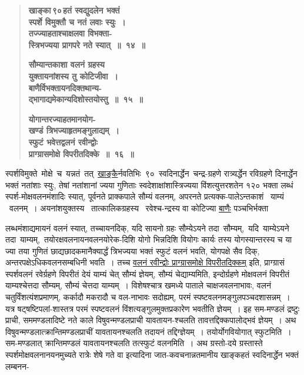 \documentclass[11pt, openany]{book}
\begin{document}
 \label{4.14}
\begin{quote}
{\large \textbf{{\color{purple}खाङ्का\textendash \,९०\textendash \,हतं स्वद्युदलेन भक्तं \\
स्पर्शे विमुक्तौ च नतं लवाः स्युः~।\\ 
तज्ज्याहताश्चाक्षलवा विभक्ता-\\
स्त्रिभज्यया प्रागपरे नते स्यात्~॥~१४~॥}}
\vspace{1mm}

 \label{4.15}
\textbf{{\color{purple}सौम्यान्तकाशा वलनं ग्रहस्य \\
युक्तायनांशस्य तु कोटिजीवा~। \\
बाणैर्विभक्तायनदिक्तथान्य-\\
द्भागाद्यमेकान्यदिशोस्तयोस्तु~॥~१५~॥}}
\vspace{1mm}

 \label{4.16}
\textbf{{\color{purple}योगान्तरज्याहतमानयोग-\\
खण्डं त्रिभज्याहृतमङ्गुलाद्यम्~। \\
स्फुटं भवेत्तद्वलनं रवीन्द्वोः \\
प्राग्ग्रासमोक्षे विपरीतदिक्के~॥~१६~॥}}}
\end{quote}

स्पर्शविमुक्ते \,मोक्षे \,च \,यन्नतं \,तत् \,\hyperref[4.14]{खाङ्कै}र्नवतिभिः \,९० \,स्वदिनार्द्धेन \,चन्द्र-ग्रहणे रात्र्यर्द्धेन रविग्रहणे दिनार्द्धेन भक्तं नतांशाः स्युः, तेषां नतांशानां ज्यया गुणिताः \;स्वदेशाक्षांशास्त्रिज्यया \;विंशत्युत्तरशतेन \;१२० \;भक्ता \;लब्धं \;स्पर्श-मोक्षवलनमंशादिः स्यात्, पूर्वनते प्राक्कपाले सौम्यं वलनम्, अपरनते प्रत्यक्क-पालेऽन्तकाशं ~याम्यं ~वलनम्~। अयनांशयुक्तस्य ~तात्कालिकग्रहस्य ~रवेश्च-न्द्रस्य वा कोटिज्या \hyperref[4.15]{बाणैः} पञ्चभिर्भक्ता

\newpage

\noindent लब्धमंशाद्यमायनं वलनं स्यात्, तच्चायनदिक्, यदि सायनो ग्रहः सौम्येऽयने तदा \,सौम्यम्, \,यदि \,याम्येऽयने \,तदा \,याम्यम्, \,तयोरक्षवलनायनवलनयोरेक-दिशि योगो भिन्नदिशि वियोगः कार्यः तस्य योगस्यान्तरस्य च या ज्या तया गुणितं छाद्यछादकमानैक्यार्द्धं त्रिभज्यया भक्तं स्फुटं वलनं भवति, योगपक्षे सैव \;दिक्, \;अन्तरपक्षेऽधिकवलनसम्बधिनी \;भवति~। तच्च \;\hyperref[4.16]{वलनं \;रवीन्द्वोः प्राग्ग्रासमोक्षे विपरीतदिक्कम्} इति, प्राग्ग्रासं स्पर्शवलनं रवेर्ग्रहणे विपरीतं देयं याम्यं चेत् सौम्यं ज्ञेयम्, सौम्यं चेद्याम्यमिति, इन्दोर्ग्रहणे मोक्षवलनं विपरीतं याम्यश्चेत्तदा \;सौम्यम्, \;सौम्यं \;चेत्तदा \;याम्यम्~। विशेषश्चात्र \;खमध्ये \;पाताले चाक्षजवलनाभावः, वलनं चतुर्विंशत्यंशप्रमाणम्, कर्कादौ मकरादौ च वल-नाभावः सदोह्यम्, परमं स्पष्टवलनमङ्गुलपञ्चदशासन्नम्~। यत्र षट्षष्टिपलां-शास्तत्र परमं स्पष्टवलनं विंशत्यङ्गुलमुक्तप्रकारेण भवतीति ज्ञेयम्~। इह सम-मण्डलं द्रष्टुः प्राची, सममण्डलादिष्टे नते काले विषुवन्मण्डलप्राची यावतायन-श्चलति तावत्तद्दिक्कपालोद्भवं ज्ञेयम्~। अथ विषुवन्मण्डलात्क्रान्तिमण्डलप्राचीं यावतायनश्चलति तदायनं तद्दिग्ज्ञेयम्~। तयोर्योगवियोगात् स्फुटमिति~। सम-मण्डलात् क्रान्तिमण्डलं यावतायनश्चलति तत्स्फुटं वलनमिति~। अथ ग्रस्तो-दये ग्रस्तास्ते स्पर्शमोक्षवलनानयनमुच्यते रात्रेः शेषे गते वा इत्यादिना जात-कवचनान्नतमानीय खाङ्कहतं स्वदिनार्द्धेन भक्तं लम्बनन-
\end{document}
